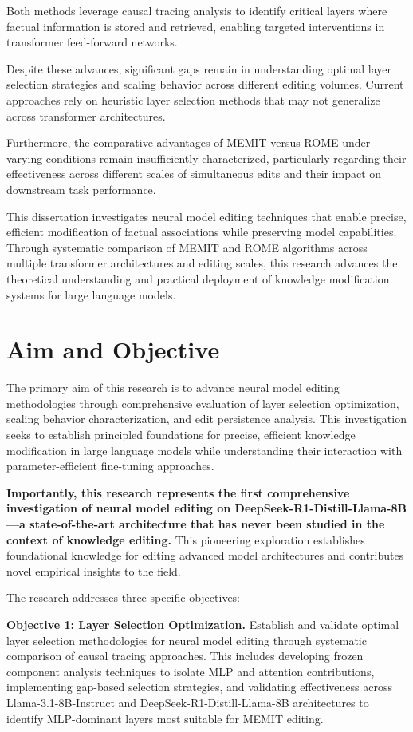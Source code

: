 Both methods leverage causal tracing analysis to identify critical layers where factual information is stored and retrieved, enabling targeted interventions in transformer feed-forward networks.

Despite these advances, significant gaps remain in understanding optimal layer selection strategies and scaling behavior across different editing volumes. Current approaches rely on heuristic layer selection methods that may not generalize across transformer architectures. 

Furthermore, the comparative advantages of MEMIT versus ROME under varying conditions remain insufficiently characterized, particularly regarding their effectiveness across different scales of simultaneous edits and their impact on downstream task performance.

This dissertation investigates neural model editing techniques that enable precise, efficient modification of factual associations while preserving model capabilities. Through systematic comparison of MEMIT and ROME algorithms across multiple transformer architectures and editing scales, this research advances the theoretical understanding and practical deployment of knowledge modification systems for large language models.

\section{Aim and Objective}
\label{sec:aim_objective}

The primary aim of this research is to advance neural model editing methodologies through comprehensive evaluation of layer selection optimization, scaling behavior characterization, and edit persistence analysis. This investigation seeks to establish principled foundations for precise, efficient knowledge modification in large language models while understanding their interaction with parameter-efficient fine-tuning approaches.

\textbf{Importantly, this research represents the first comprehensive investigation of neural model editing on DeepSeek-R1-Distill-Llama-8B—a state-of-the-art architecture that has never been studied in the context of knowledge editing.} This pioneering exploration establishes foundational knowledge for editing advanced model architectures and contributes novel empirical insights to the field.

The research addresses three specific objectives:

\textbf{Objective 1: Layer Selection Optimization.} Establish and validate optimal layer selection methodologies for neural model editing through systematic comparison of causal tracing approaches. This includes developing frozen component analysis techniques to isolate MLP and attention contributions, implementing gap-based selection strategies, and validating effectiveness across Llama-3.1-8B-Instruct and DeepSeek-R1-Distill-Llama-8B architectures to identify MLP-dominant layers most suitable for MEMIT editing.


